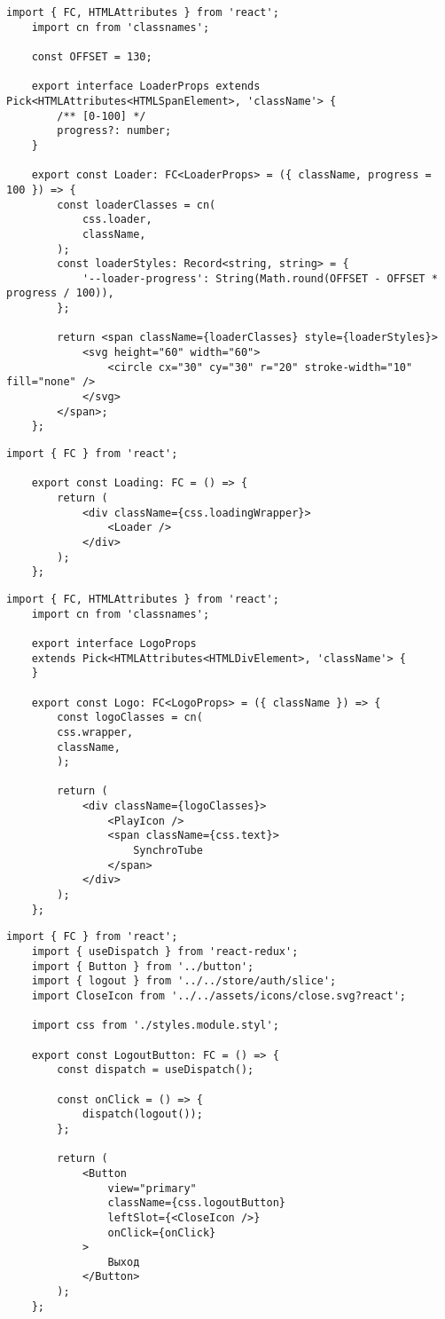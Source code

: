\begin{lstlisting}[caption={config/slice.ts}]
	import { FC, HTMLAttributes } from 'react';
	import cn from 'classnames';
	
	const OFFSET = 130;
	
	export interface LoaderProps extends Pick<HTMLAttributes<HTMLSpanElement>, 'className'> {
		/** [0-100] */
		progress?: number;
	}
	
	export const Loader: FC<LoaderProps> = ({ className, progress = 100 }) => {
		const loaderClasses = cn(
			css.loader,
			className,
		);
		const loaderStyles: Record<string, string> = {
			'--loader-progress': String(Math.round(OFFSET - OFFSET * progress / 100)),
		};
		
		return <span className={loaderClasses} style={loaderStyles}>
			<svg height="60" width="60">
				<circle cx="30" cy="30" r="20" stroke-width="10" fill="none" />
			</svg>
		</span>;
	};
\end{lstlisting}

\begin{lstlisting}[caption={Loading.tsx}]
	import { FC } from 'react';
	
	export const Loading: FC = () => {
		return (
			<div className={css.loadingWrapper}>
				<Loader />
			</div>
		);
	};
\end{lstlisting}

\begin{lstlisting}[caption={Logo.tsx}]
	import { FC, HTMLAttributes } from 'react';
	import cn from 'classnames';
	
	export interface LogoProps
	extends Pick<HTMLAttributes<HTMLDivElement>, 'className'> {
	}
	
	export const Logo: FC<LogoProps> = ({ className }) => {
		const logoClasses = cn(
		css.wrapper,
		className,
		);
		
		return (
			<div className={logoClasses}>
				<PlayIcon />
				<span className={css.text}>
					SynchroTube
				</span>
			</div>
		);
	};
\end{lstlisting}

\begin{lstlisting}[caption={LogoutButton.tsx}]
	import { FC } from 'react';
	import { useDispatch } from 'react-redux';
	import { Button } from '../button';
	import { logout } from '../../store/auth/slice';
	import CloseIcon from '../../assets/icons/close.svg?react';
	
	import css from './styles.module.styl';
	
	export const LogoutButton: FC = () => {
		const dispatch = useDispatch();    
		
		const onClick = () => {
			dispatch(logout());
		};  
		
		return (
			<Button
				view="primary"
				className={css.logoutButton}
				leftSlot={<CloseIcon />}
				onClick={onClick}
			>
				Выход
			</Button>
		);
	};
\end{lstlisting}

